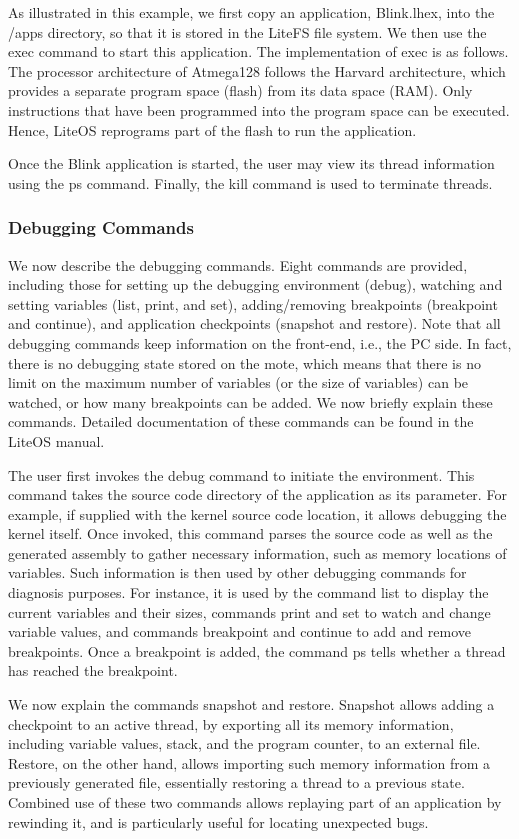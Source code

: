 As illustrated in this example, we first copy an application, Blink.lhex, into the /apps directory, so that it is stored
in the LiteFS file system. We then use the exec command to
start this application. The implementation of exec is as follows. The processor architecture of Atmega128 follows the
Harvard architecture, which provides a separate program
space (flash) from its data space (RAM). Only instructions
that have been programmed into the program space can be
executed. Hence, LiteOS reprograms part of the flash to run
the application.

Once the Blink application is started, the user may view
its thread information using the ps command. Finally, the
kill command is used to terminate threads.

\subsubsection{Debugging Commands}
We now describe the debugging commands. Eight commands are provided, including those for setting up the debugging environment (debug), watching and setting variables (list, print, and set), adding/removing breakpoints
(breakpoint and continue), and application checkpoints
(snapshot and restore). Note that all debugging commands
keep information on the front-end, i.e., the PC side. In
fact, there is no debugging state stored on the mote, which
means that there is no limit on the maximum number of
variables (or the size of variables) can be watched, or how
many breakpoints can be added. We now briefly explain
these commands. Detailed documentation of these commands can be found in the LiteOS manual.

The user first invokes the debug command to initiate
the environment. This command takes the source code directory of the application as its parameter. For example,
if supplied with the kernel source code location, it allows
debugging the kernel itself. Once invoked, this command
parses the source code as well as the generated assembly
to gather necessary information, such as memory locations
of variables. Such information is then used by other debugging commands for diagnosis purposes. For instance,
it is used by the command list to display the current variables and their sizes, commands print and set to watch
and change variable values, and commands breakpoint and
continue to add and remove breakpoints. Once a breakpoint
is added, the command ps tells whether a thread has reached
the breakpoint.

We now explain the commands snapshot and restore.
Snapshot allows adding a checkpoint to an active thread,
by exporting all its memory information, including variable
values, stack, and the program counter, to an external file.
Restore, on the other hand, allows importing such memory information from a previously generated file, essentially
restoring a thread to a previous state. Combined use of these
two commands allows replaying part of an application by
rewinding it, and is particularly useful for locating unexpected bugs.

